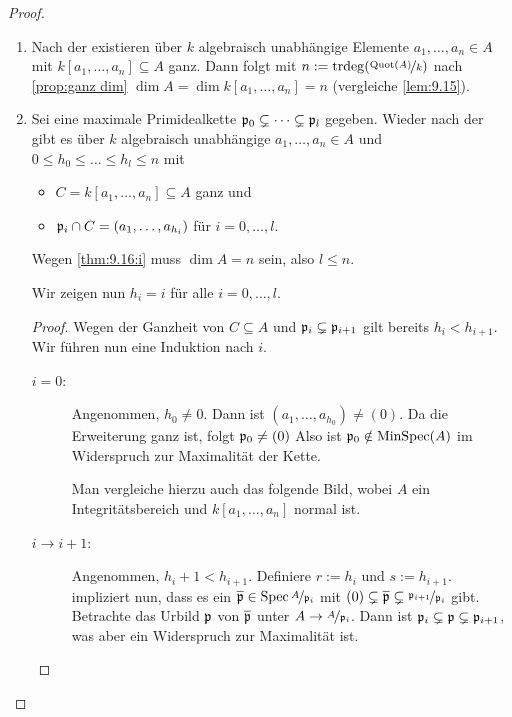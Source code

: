 \documentclass[12pt,a4paper]{scrartcl}
\theoremstyle{cplain}
\theoremstyle{cdef}
\begin{document}
\begin{proof}
	\leavevmode
	\begin{enumerate}[label=\ref{thm:9.16:\roman*}]
		\item Nach der  existieren über $k$ algebraisch unabhängige Elemente $a_1,\dots, a_n\in A$ mit $k[a_1,\dots, a_n]\subseteq A$ ganz. Dann folgt mit $n := \operatorname{trdeg}(\nicefrac{\operatorname{Quot}(A)}{k})$ nach \cref{prop:ganz dim} $\dim A = \dim k[a_1,\dots, a_n] = n$ (vergleiche \cref{lem:9.15}).
		\item Sei eine maximale Primidealkette $\mathfrak{p}_0\subsetneq \dots \subsetneq \mathfrak{p}_l$ gegeben. Wieder nach der  gibt es über $k$ algebraisch unabhängige $a_1,\dots, a_n\in A$ und $0\le h_0\le \dots \le h_l\le n$ mit
		\begin{itemize}
			\item $C = k[a_1,\dots, a_n]\subseteq A$ ganz und
			\item $\mathfrak{p}_i\cap C = (a_1,\dots, a_{h_i})$ für $i = 0,\dots, l$.
		\end{itemize}
		Wegen \ref{thm:9.16:i} muss $\dim A = n$ sein, also $l\le n$.
		
		Wir zeigen nun $h_i = i$ für alle $i = 0,\dots, l$.
		
		\begin{proof}
			Wegen der Ganzheit von $C\subseteq A$ und $\mathfrak{p}_i\subsetneq \mathfrak{p}_{i+1}$ gilt bereits $h_i<h_{i+1}$. Wir führen nun eine Induktion nach $i$.
			\begin{description}
				\item[$i = 0$:] Angenommen, $h_0\neq 0$. Dann ist $(a_1,\dots, a_{h_0}) \neq (0)$. Da die Erweiterung ganz ist, folgt $\mathfrak{p}_0 \neq (0)$ Also ist $\mathfrak{p}_0\notin \operatorname{MinSpec}(A)$ im Widerspruch zur Maximalität der Kette.
				
				Man vergleiche hierzu auch das folgende Bild, wobei $A$ ein Integritätsbereich und $k[a_1,\dots, a_n]$ normal ist.
				\begin{center}
				\end{center}				
				\item[$i\to i+1$:] Angenommen, $h_i+1 < h_{i+1}$. Definiere $r := h_i$ und $s := h_{i+1}$.  impliziert nun, dass es ein $\overline{\mathfrak{p}}\in \operatorname{Spec} \nicefrac{A}{\mathfrak{p}_i}$ mit $(0)\subsetneq \overline{\mathfrak{p}} \subsetneq \nicefrac{\mathfrak{p}_{i+1}}{\mathfrak{p}_i}$ gibt. Betrachte das Urbild $\mathfrak{p}$ von $\overline{\mathfrak{p}}$ unter $A\to \nicefrac{A}{\mathfrak{p}_i}$. Dann ist $\mathfrak{p}_i\subsetneq \mathfrak{p}\subsetneq \mathfrak{p}_{i+1}$, was aber ein Widerspruch zur Maximalität ist.
				

\end{description}
\end{proof}
\end{enumerate}
\end{proof}
\end{document}
